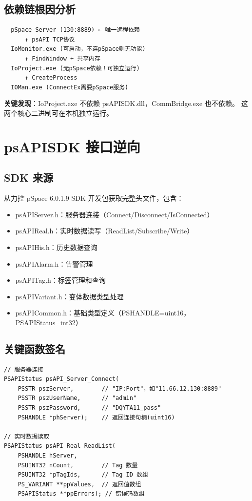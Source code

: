 \documentclass[12pt,a4paper]{ctexart}
\begin{document}
\subsection{依赖链根因分析}
\begin{verbatim}
  pSpace Server (130:8889) ← 唯一远程依赖
      ↑ psAPI TCP协议
  IoMonitor.exe (可启动，不连pSpace则无功能)
      ↑ FindWindow + 共享内存
  IoProject.exe (无pSpace依赖！可独立运行)
      ↑ CreateProcess
  IOMan.exe (ConnectEx需要pSpace服务)
\end{verbatim}

\textbf{关键发现}：IoProject.exe 不依赖 psAPISDK.dll，CommBridge.exe 也不依赖。
这两个核心二进制可在本机独立运行。

\section{psAPISDK 接口逆向}

\subsection{SDK 来源}
从力控 pSpace 6.0.1.9 SDK 开发包获取完整头文件，包含：
\begin{itemize}[leftmargin=*]
  \item psAPIServer.h：服务器连接（Connect/Disconnect/IsConnected）
  \item psAPIReal.h：实时数据读写（ReadList/Subscribe/Write）
  \item psAPIHis.h：历史数据查询
  \item psAPIAlarm.h：告警管理
  \item psAPITag.h：标签管理和查询
  \item psAPIVariant.h：变体数据类型处理
  \item psAPICommon.h：基础类型定义（PSHANDLE=uint16，PSAPIStatus=int32）
\end{itemize}

\subsection{关键函数签名}
\begin{verbatim}
// 服务器连接
PSAPIStatus psAPI_Server_Connect(
    PSSTR pszServer,        // "IP:Port"，如"11.66.12.130:8889"
    PSSTR pszUserName,      // "admin"
    PSSTR pszPassword,      // "DQYTA11_pass"
    PSHANDLE *phServer);    // 返回连接句柄(uint16)

// 实时数据读取
PSAPIStatus psAPI_Real_ReadList(
    PSHANDLE hServer,
    PSUINT32 nCount,        // Tag 数量
    PSUINT32 *pTagIds,      // Tag ID 数组
    PS_VARIANT **ppValues,  // 返回值数组
    PSAPIStatus **ppErrors); // 错误码数组
\end{verbatim}
\end{document}
